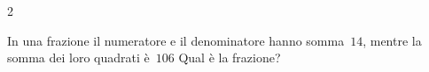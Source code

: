 \begin{htmulticols}{2}
\begin{esercizio}[*]
\label{ese:3.127}
In una frazione il numeratore e il denominatore hanno somma~\(14\), mentre 
la somma dei loro quadrati è~\(106\) Qual è la frazione?
\end{esercizio}

\end{htmulticols}
